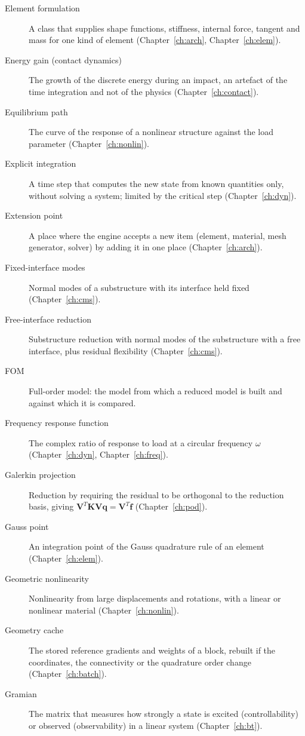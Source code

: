 \begin{description}
\item[Element formulation] A class that supplies shape functions, stiffness, internal force, tangent and mass for one kind of element (Chapter~\ref{ch:arch}, Chapter~\ref{ch:elem}).
\item[Energy gain (contact dynamics)] The growth of the discrete energy during an impact, an artefact of the time integration and not of the physics (Chapter~\ref{ch:contact}).
\item[Equilibrium path] The curve of the response of a nonlinear structure against the load parameter (Chapter~\ref{ch:nonlin}).
\item[Explicit integration] A time step that computes the new state from known quantities only, without solving a system; limited by the critical step (Chapter~\ref{ch:dyn}).
\item[Extension point] A place where the engine accepts a new item (element, material, mesh generator, solver) by adding it in one place (Chapter~\ref{ch:arch}).
\item[Fixed-interface modes] Normal modes of a substructure with its interface held fixed (Chapter~\ref{ch:cms}).
\item[Free-interface reduction] Substructure reduction with normal modes of the substructure with a free interface, plus residual flexibility (Chapter~\ref{ch:cms}).
\item[FOM] Full-order model: the model from which a reduced model is built and against which it is compared.
\item[Frequency response function] The complex ratio of response to load at a circular frequency $\omega$ (Chapter~\ref{ch:dyn}, Chapter~\ref{ch:freq}).
\item[Galerkin projection] Reduction by requiring the residual to be orthogonal to the reduction basis, giving $\bm V^T\bm K\bm V\bm q=\bm V^T\bm f$ (Chapter~\ref{ch:pod}).
\item[Gauss point] An integration point of the Gauss quadrature rule of an element (Chapter~\ref{ch:elem}).
\item[Geometric nonlinearity] Nonlinearity from large displacements and rotations, with a linear or nonlinear material (Chapter~\ref{ch:nonlin}).
\item[Geometry cache] The stored reference gradients and weights of a block, rebuilt if the coordinates, the connectivity or the quadrature order change (Chapter~\ref{ch:batch}).
\item[Gramian] The matrix that measures how strongly a state is excited (controllability) or observed (observability) in a linear system (Chapter~\ref{ch:bt}).

\end{description}
